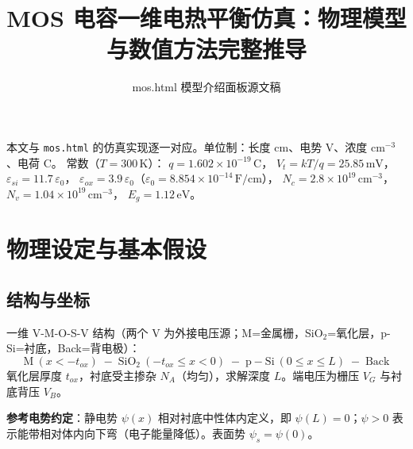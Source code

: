 \documentclass[11pt]{ctexart}
\title{MOS 电容一维电热平衡仿真：物理模型与数值方法完整推导}
\author{mos.html 模型介绍面板源文稿}
\date{}
\begin{document}
\maketitle

\noindent 本文与 \texttt{mos.html} 的仿真实现逐一对应。单位制：长度 cm、电势 V、浓度 cm$^{-3}$、电荷 C。
常数（$T=300\,\mathrm{K}$）：
\(q=1.602\times10^{-19}\,\mathrm{C}\)，
\(V_t=kT/q=25.85\,\mathrm{mV}\)，
\(\varepsilon_{si}=11.7\,\varepsilon_0\)，
\(\varepsilon_{ox}=3.9\,\varepsilon_0\)（$\varepsilon_0=8.854\times10^{-14}\,\mathrm{F/cm}$），
\(N_c=2.8\times10^{19}\,\mathrm{cm^{-3}}\)，
\(N_v=1.04\times10^{19}\,\mathrm{cm^{-3}}\)，
\(E_g=1.12\,\mathrm{eV}\)。

\section{物理设定与基本假设}

\subsection{结构与坐标}
一维 V-M-O-S-V 结构（两个 V 为外接电压源；M=金属栅，SiO$_2$=氧化层，p-Si=衬底，Back=背电极）：
\[\mathrm{M}\ (x<-t_{ox})\;-\;\mathrm{SiO_2}\ (-t_{ox}\le x<0)\;-\;\mathrm{p\!-\!Si}\ (0\le x\le L)\;-\;\mathrm{Back}\]
氧化层厚度
\(t_{ox}\)，衬底受主掺杂
\(N_A\)（均匀），求解深度
\(L\)。端电压为栅压
\(V_G\) 与衬底背压
\(V_B\)。

\textbf{参考电势约定}：静电势
\(\psi(x)\) 相对衬底中性体内定义，即
\(\psi(L)=0\)；$\psi>0$ 表示能带相对体内向下弯（电子能量降低）。表面势
\(\psi_s=\psi(0)\)。
\end{document}
